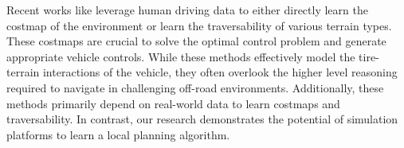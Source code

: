 Recent works like \cite{triestLearningRiskAwareCostmaps2023, caiProbabilisticTraversabilityModel2023a,sathyamoorthyTerraPNUnstructuredTerrain2022,gasparinoWayFASTNavigationPredictive2022}
leverage human driving data to either directly learn the costmap of the environment or learn the traversability of various terrain types. 
These costmaps are crucial to solve the optimal control problem and generate appropriate vehicle controls. While these methods effectively model the tire-terrain interactions of the vehicle, they often overlook the higher level reasoning required to navigate in challenging off-road environments. Additionally, these methods primarily depend on real-world data to learn costmaps and traversability. In contrast, our research demonstrates the potential of simulation platforms to learn a local planning algorithm. 

%